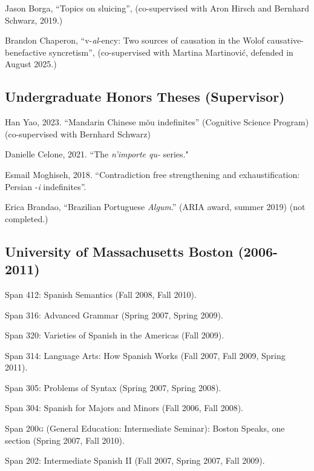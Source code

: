 \documentclass[11pt]{article}
\begin{document}
Jason Borga, ``Topics on sluicing'', (co-supervised with Aron Hirsch and Bernhard Schwarz, 2019.)


Brandon Chaperon, ``v-\textit{al}-ency: Two sources of causation in the Wolof
causative-benefactive syncretism'', (co-supervised with Martina Martinovi\'c, defended in August 2025.)


\subsection*{Undergraduate Honors Theses (Supervisor)}

Han Yao, 2023. ``Mandarin Chinese m\u{o}u indefinites'' (Cognitive Science Program) (co-supervised with Bernhard Schwarz)

Danielle Celone, 2021. ``The \textit{n'importe qu-} series." 

Esmail Moghiseh, 2018. ``Contradiction free strengthening and exhaustification: Persian -\textit{i} indefinites''.

Erica Brandao, ``Brazilian Portuguese \textit{Algum}.'' (ARIA award, summer 2019) (not completed.)

 

\subsection*{University of Massachusetts Boston (2006-2011)}


Span 412: Spanish Semantics (Fall 2008, Fall 2010).

Span 316: Advanced Grammar (Spring 2007, Spring 2009).

Span 320: Varieties of Spanish in the Americas (Fall 2009).

Span 314: Language Arts: How Spanish Works (Fall 2007, Fall 2009,
Spring 2011).

Span 305: Problems of Syntax (Spring 2007, Spring 2008).

Span 304: Spanish for Majors and Minors (Fall 2006, Fall 2008).

Span 200\textsc{g} (General Education: Intermediate Seminar): Boston
Speaks, one section (Spring 2007, Fall 2010).

Span 202: Intermediate Spanish II  (Fall 2007, Spring 2007, Fall
2009).
\end{document}
